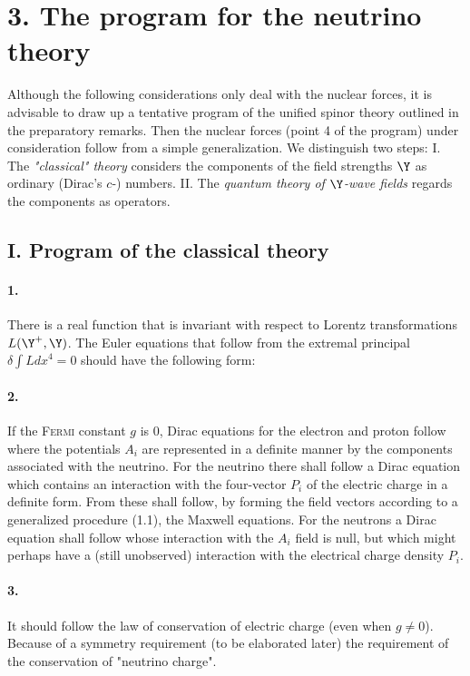 \documentclass{article}
\begin{document}
\section*{3. The program for the neutrino theory}

Although the following considerations only deal with the nuclear forces, it is advisable to draw up a tentative program of the unified spinor theory outlined in the preparatory remarks. Then the nuclear forces (point 4 of the program) under consideration follow from a simple generalization. We distinguish two steps: I. The \textit{"classical" theory} considers the components of the field strengths $\Y$ as ordinary (Dirac's $c$-) numbers. II. The \textit{quantum theory of $\Y$-wave fields} regards the components as operators.

\subsection*{I. Program of the classical theory}

\paragraph*{1.} There is a real function that is invariant with respect to Lorentz transformations $L(\Y^+,\Y)$. The Euler equations that follow from the extremal principal $\delta\int L{dx}^4 = 0$ should have the following form:

\paragraph*{2.} If the \textsc{Fermi} constant $g$ is $0$, Dirac equations for the electron and proton follow where the potentials $A_i$ are represented in a definite manner by the components associated with the neutrino. For the neutrino there shall follow a Dirac equation which contains an interaction with the four-vector $P_i$ of the electric charge in a definite form. From these shall follow, by forming the field vectors according to a generalized procedure (1.1), the Maxwell equations. For the neutrons a Dirac equation shall follow whose interaction with the $A_i$ field is null, but which might perhaps have a (still unobserved) interaction with the electrical charge density $P_i$.

\paragraph*{3.} It should follow the law of conservation of electric charge (even when $g\neq 0$). Because of a symmetry requirement (to be elaborated later)  the requirement of the conservation of "neutrino charge"\cite{8}.
\end{document}
